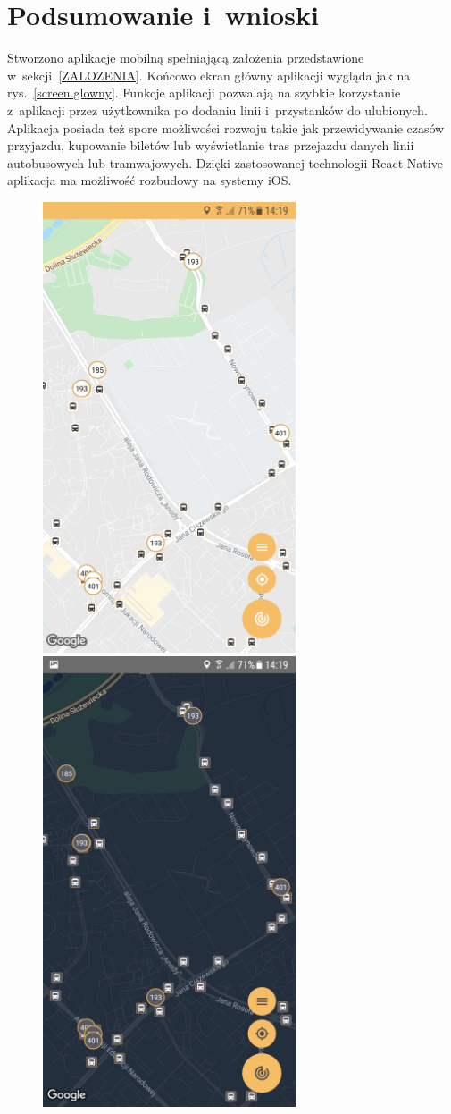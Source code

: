 \documentclass{SGGW-thesis}
\begin{document}
\chapter{Podsumowanie i~wnioski}
Stworzono aplikacje mobilną spełniającą założenia przedstawione w~sekcji~\ref{ZALOZENIA}.
Końcowo ekran główny aplikacji wygląda jak na rys.~\ref{screen.glowny}.
Funkcje aplikacji pozwalają na szybkie korzystanie z~aplikacji przez użytkownika po dodaniu linii i~przystanków do ulubionych.
Aplikacja posiada też spore możliwości rozwoju takie jak przewidywanie czasów przyjazdu, kupowanie biletów lub wyświetlanie tras przejazdu danych linii autobusowych lub tramwajowych.
Dzięki zastosowanej technologii React-Native aplikacja ma możliwość rozbudowy na systemy iOS.
\begin{figure}
  \centering
  \includegraphics[width=75mm]{screeny/glowny_jasny}
  \enspace
  \includegraphics[width=75mm]{screeny/glowny_ciemny}

\end{figure}
\end{document}

